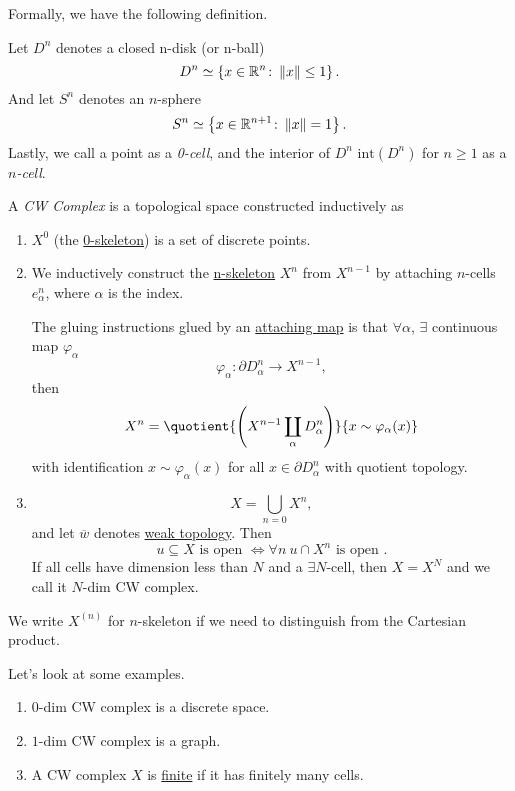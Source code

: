 \hr

Formally, we have the following definition.
\begin{notation}
	Let \(D^n\) denotes a closed n-disk (or n-ball)
	\[
		D^n\simeq \left\{x\in\mathbb{\MakeUppercase{R}} ^n\colon \left\lVert x\right\rVert \leq 1\right\}.
	\]
	And let \(S^n\) denotes an \(n\)-sphere
	\[
		S^n\simeq \left\{x\in \mathbb{\MakeUppercase{R}}^{n+1}\colon \left\lVert x\right\rVert = 1\right\}.
	\]
	Lastly, we call a point as a \emph{0-cell}, and the interior of \(D^n\) \(\mathrm{int}(D^n)\) for \(n\geq 1\) as a \emph{\(n\)-cell}.
\end{notation}
\begin{definition}[CW Complex]\label{def:CW-Complex}
	A \emph{CW Complex} is a topological space constructed inductively as
	\begin{enumerate}
		\item \(X^0\) (the \underline{0-skeleton}) is a set of discrete points.
		\item We inductively construct the \underline{n-skeleton} \(X^n\) from \(X^{n-1}\) by attaching \(n\)-cells \(e^n_{\alpha}\), where
		      \(\alpha\) is the index.
		      \par The gluing instructions glued by an \underline{attaching map} is that \(\forall \alpha\), \(\exists \) continuous map \(\varphi_{\alpha}\)
		      \[
			      \varphi_{\alpha}\colon \partial D^n_{\alpha}\to X^{n-1},
		      \]
		      then
		      \[
			      X^n = \quotient{\left(X^{n-1}\coprod\limits_{\alpha}D^n_\alpha\right)}{x\sim \varphi_{\alpha}(x)}
		      \]
		      with identification \(x\sim \varphi_{\alpha}(x)\) for all \(x\in \partial D^n_{\alpha}\) with quotient topology.
		\item
		      \[
			      X = \bigcup\limits_{n=0} X^n,
		      \]
		      and let \(\overline{w} \) denotes \underline{weak topology}. Then
		      \[
			      u\subseteq X \text{ is open }\iff \forall n\ u\cap X^n \text{ is open }.
		      \]
		      If all cells have dimension less than \(N\) and a \(\exists N\)-cell, then \(X = X^N\) and we call it \(N\)-dim CW complex.
	\end{enumerate}
\end{definition}

\begin{remark}
	We write \(X^{(n)}\) for \(n\)-skeleton if we need to distinguish from the Cartesian product.
\end{remark}

\begin{eg}
	Let's look at some examples.
	\begin{enumerate}
		\item \(0\)-dim CW complex is a discrete space.
		\item \(1\)-dim CW complex is a graph.
		\item A CW complex \(X\) is \underline{finite} if it has finitely many cells.
	\end{enumerate}
\end{eg}

